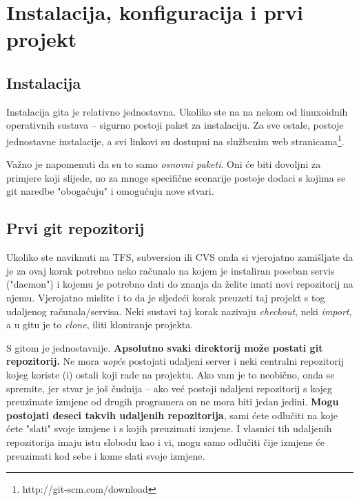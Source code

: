 \chapter*{Instalacija, konfiguracija i prvi projekt}

\section*{Instalacija}

Instalacija gita je relativno jednostavna. Ukoliko ste na na nekom od linuxoidnih operativnih sustava -- sigurno postoji paket za instalaciju. 
Za sve ostale, postoje jednostavne instalacije, a svi linkovi su dostupni na službenim web stranicama\footnote{http://git-scm.com/download}.

Važno je napomenuti da su to samo \emph{osnovni paketi}. 
Oni će biti dovoljni za primjere koji slijede, no za mnoge specifične scenarije postoje dodaci s kojima se git naredbe "obogaćuju" i omogućuju nove stvari.

\section*{Prvi git repozitorij}

Ukoliko ste naviknuti na TFS, subversion ili CVS onda si vjerojatno zamišljate da je za ovaj korak potrebno neko računalo na kojem je instaliran poseban servis ("daemon") i kojemu je potrebno dati do znanja da želite imati novi repozitorij na njemu.
Vjerojatno mislite i to da je sljedeći korak preuzeti taj projekt s tog udaljenog računala/servisa.
Neki sustavi taj korak nazivaju \emph{checkout}, neki \emph{import}, a u gitu je to \emph{clone}, iliti kloniranje projekta.

S gitom je jednostavnije. 
\textbf{Apsolutno svaki direktorij može postati git repozitorij.}
Ne mora \emph{uopće} postojati udaljeni server i neki centralni repozitorij kojeg koriste (i) ostali koji rade na projektu.
Ako vam je to neobično, onda se spremite, jer stvar je još čudnija -- ako već postoji udaljeni repozitorij s kojeg preuzimate izmjene od drugih programera on ne mora biti jedan jedini.
\textbf{Mogu postojati deseci takvih udaljenih repozitorija}, sami ćete odlučiti na koje ćete "slati" svoje izmjene i s kojih preuzimati izmjene.
I vlasnici tih udaljenih repozitorija imaju istu slobodu kao i vi, mogu samo odlučiti čije izmjene će preuzimati kod sebe i kome slati svoje izmjene.

